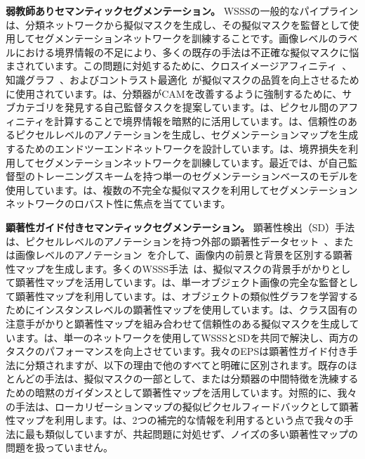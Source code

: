 \documentclass[final]{cvpr}
\begin{document}
\noindent\textbf{弱教師ありセマンティックセグメンテーション。}
WSSSの一般的なパイプラインは、分類ネットワークから擬似マスクを生成し、その擬似マスクを監督として使用してセグメンテーションネットワークを訓練することです。画像レベルのラベルにおける境界情報の不足により、多くの既存の手法は不正確な擬似マスクに悩まされています。この問題に対処するために、クロスイメージアフィニティ~\cite{fan2020cian}、知識グラフ~\cite{liu2020leveraging}、およびコントラスト最適化~\cite{sun2020mining, zhang2020splitting}が擬似マスクの品質を向上させるために使用されています。\cite{chang2020weakly}は、分類器がCAMを改善するように強制するために、サブカテゴリを発見する自己監督タスクを提案しています。\cite{ahn2019weakly, ahn2018learning}は、ピクセル間のアフィニティを計算することで境界情報を暗黙的に活用しています。\cite{zhang2020reliability}は、信頼性のあるピクセルレベルのアノテーションを生成し、セグメンテーションマップを生成するためのエンドツーエンドネットワークを設計しています。\cite{huang2018weakly, kolesnikov2016seed}は、境界損失を利用してセグメンテーションネットワークを訓練しています。最近では、\cite{araslanov2020single}が自己監督型のトレーニングスキームを持つ単一のセグメンテーションベースのモデルを使用しています。\cite{fan2020employing}は、複数の不完全な擬似マスクを利用してセグメンテーションネットワークのロバスト性に焦点を当てています。



\vspace{1mm}
\noindent\textbf{顕著性ガイド付きセマンティックセグメンテーション。}
顕著性検出（SD）手法は、ピクセルレベルのアノテーションを持つ外部の顕著性データセット~\cite{hou2017deeply, xiao2018deep, zhao2019pyramid}、または画像レベルのアノテーション~\cite{wang2017learning}を介して、画像内の前景と背景を区別する顕著性マップを生成します。多くのWSSS手法~\cite{fan2020cian, huang2018weakly, lee2019ficklenet, li2018tell, wei2017object, wei2018revisiting}は、擬似マスクの背景手がかりとして顕著性マップを活用しています。\cite{wei2016stc}は、単一オブジェクト画像の完全な監督として顕著性マップを利用しています。\cite{fan2018associating}は、オブジェクトの類似性グラフを学習するためにインスタンスレベルの顕著性マップを使用しています。\cite{chaudhry_dcsp_2017, wang2018weakly, yao2020saliency}は、クラス固有の注意手がかりと顕著性マップを組み合わせて信頼性のある擬似マスクを生成しています。\cite{zeng2019joint}は、単一のネットワークを使用してWSSSとSDを共同で解決し、両方のタスクのパフォーマンスを向上させています。我々のEPSは顕著性ガイド付き手法に分類されますが、以下の理由で他のすべてと明確に区別されます。既存のほとんどの手法は、擬似マスクの一部として、または分類器の中間特徴を洗練するための暗黙のガイダンスとして顕著性マップを活用しています。対照的に、我々の手法は、ローカリゼーションマップの擬似ピクセルフィードバックとして顕著性マップを利用します。\cite{zeng2019joint}は、2つの補完的な情報を利用するという点で我々の手法に最も類似していますが、共起問題に対処せず、ノイズの多い顕著性マップの問題を扱っていません。
\end{document}
